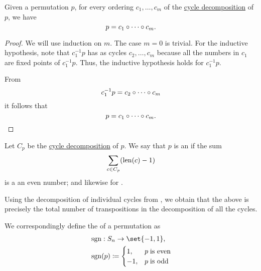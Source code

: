 \begin{proposition}\label{thm:permutation_decomposition}
  Given a permutation \( p \), for every ordering \( c_1, \ldots, c_m \) of the \hyperref[def:permutation_cycle_decomposition]{cycle decomposition} of \( p \), we have
  \begin{equation*}
    p = c_1 \bincirc \cdots \bincirc c_m.
  \end{equation*}
\end{proposition}
\begin{proof}
  We will use induction on \( m \). The case \( m = 0 \) is trivial. For the inductive hypothesis, note that \( c_1^{-1} p \) has as cycles \( c_2, \ldots, c_m \) because all the numbers in \( c_1 \) are fixed points of \( c_1^{-1} p \). Thus, the inductive hypothesis holds for \( c_1^{-1} p \).

  From
  \begin{equation*}
    c_1^{-1} p = c_2 \bincirc \cdots \bincirc c_m
  \end{equation*}
  it follows that
  \begin{equation*}
    p = c_1 \bincirc \cdots \bincirc c_m.
  \end{equation*}
\end{proof}

\begin{definition}\label{def:permutation_parity}
  Let \( C_p \) be the \hyperref[def:permutation_cycle_decomposition]{cycle decomposition} of \( p \). We say that \( p \) is an  if the sum
  \begin{equation*}
    \sum_{c \in C_p} (\operatorname{len}(c) - 1)
  \end{equation*}
  is a an even number; and likewise for .

  Using the decomposition of individual cycles from , we obtain that the above is precisely the total number of transpositions in the decomposition of all the cycles.

  We correspondingly define the  of a permutation as
  \begin{equation*}
    \begin{aligned}
       &\sgn: S_n \to \set{ -1, 1 }, \\
       &\sgn(p) \coloneqq \begin{cases}
        1,  &p \T{is even} \\
        -1, &p \T{is odd}
      \end{cases}
    \end{aligned}
  \end{equation*}
\end{definition}

